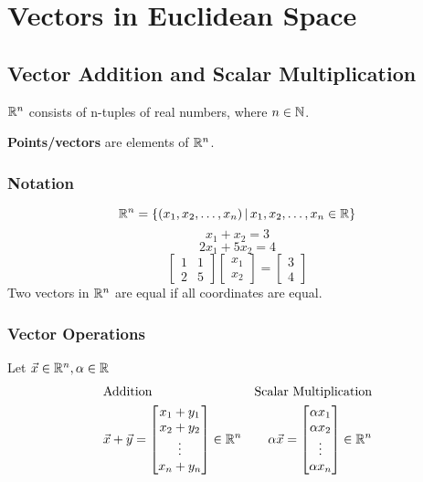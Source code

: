 \documentclass[english, 12pt]{article}
\begin{document}
\notesheader

\section{Vectors in Euclidean Space}

\subsection{Vector Addition and Scalar Multiplication}


\begin{defn}
${\mathbb{R}}^n$ consists of n-tuples of real numbers, where $n \in {\mathbb{N}}$.
\end{defn}

\begin{defn}
\textbf{Points/vectors} are elements of ${\mathbb{R}}^n$.
\end{defn}
\subsubsection*{Notation}
\[{\mathbb{R}}^n = \{(x_{1},x_{2},\dots,x_{n})\,|\, x_{1},x_{2},\dots,x_{n} \in {\mathbb{R}} \}\]
\[x_{1} + x_{2} = 3\]
\[2 x_{1} + 5 x_{2} = 4\]
\[
\begin{bmatrix} 1 & 1 \\ 2 & 5 \end{bmatrix}
\begin{bmatrix} x_{1} \\ x_{2} \end{bmatrix} =
\begin{bmatrix} 3\\ 4 \end{bmatrix} \]
Two vectors in ${\mathbb{R}}^n$ are equal if all coordinates are equal.
\subsubsection*{Vector Operations}
Let $\vec{x} \in {\mathbb{R}}^n, \alpha \in {\mathbb{R}}$
\begin{align*}
& \text{Addition} & \text{Scalar Multiplication} \\
& \vec{x} + \vec{y} =
\begin{bmatrix}
x_{1} + y_{1} \\
x_{2} + y_{2} \\
\vdots \\
x_{n} + y_{n}
\end{bmatrix} \in {\mathbb{R}}^n &
\alpha \vec{x} =
\begin{bmatrix}
\alpha x_{1} \\
\alpha x_{2} \\
\vdots \\
\alpha x_{n}
\end{bmatrix} \in {\mathbb{R}}^n
\end{align*}
\end{document}

